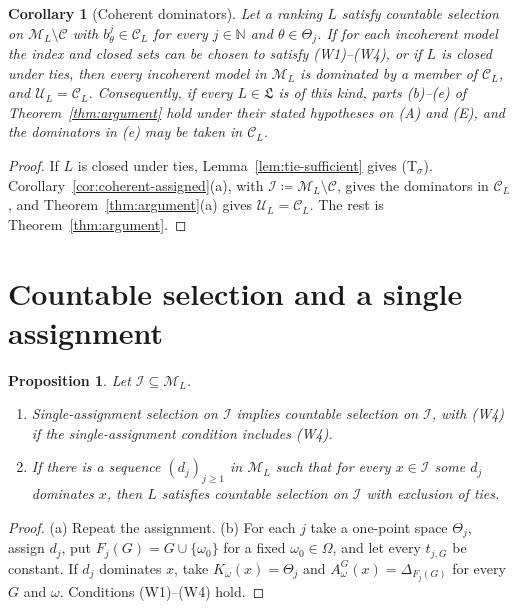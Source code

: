 \documentclass[11pt]{article}
\newtheorem{proposition}[theorem]{Proposition}
\newtheorem{corollary}[theorem]{Corollary}
\theoremstyle{definition}
\theoremstyle{remark}
\newcommand{\M}{\mathcal M}
\newcommand{\C}{\mathcal C}
\newcommand{\I}{\mathcal I}
\newcommand{\U}{\mathcal U}
\newcommand{\Lf}{\mathfrak L}
\begin{document}
\begin{corollary}[Coherent dominators]\label{cor:coherent-dominators}
Let a ranking $L$ satisfy countable selection on $\M_L\setminus\C$ with $b^j_\theta\in\C_L$ for every $j\in\mathbb N$ and $\theta\in\Theta_j$. If for each incoherent model the index and closed sets can be chosen to satisfy (W1)--(W4), or if $L$ is closed under ties, then every incoherent model in $\M_L$ is dominated by a member of $\C_L$, and $\U_L=\C_L$. Consequently, if every $L\in\Lf$ is of this kind, parts (b)--(e) of Theorem~\ref{thm:argument} hold under their stated hypotheses on (A) and (E), and the dominators in (e) may be taken in $\C_L$.
\end{corollary}
\begin{proof}
If $L$ is closed under ties, Lemma~\ref{lem:tie-sufficient} gives (T$_\sigma$). Corollary~\ref{cor:coherent-assigned}(a), with $\I\coloneqq\M_L\setminus\C$, gives the dominators in $\C_L$, and Theorem~\ref{thm:argument}(a) gives $\U_L=\C_L$. The rest is Theorem~\ref{thm:argument}.
\end{proof}

\section{Countable selection and a single assignment}\label{sec:scope}

\begin{proposition}\label{prop:comparison}
Let $\I\subseteq\M_L$.
\begin{enumerate}[label=(\alph*)]
\item Single-assignment selection on $\I$ implies countable selection on $\I$, with (W4) if the single-assignment condition includes (W4).
\item If there is a sequence $(d_j)_{j\ge1}$ in $\M_L$ such that for every $x\in\I$ some $d_j$ dominates $x$, then $L$ satisfies countable selection on $\I$ with exclusion of ties.
\end{enumerate}
\end{proposition}
\begin{proof}
(a) Repeat the assignment. (b) For each $j$ take a one-point space $\Theta_j$, assign $d_j$, put $F_j(G)=G\cup\{\omega_0\}$ for a fixed $\omega_0\in\Omega$, and let every $t_{j,G}$ be constant. If $d_j$ dominates $x$, take $K_\omega(x)=\Theta_j$ and $A^G_\omega(x)=\Delta_{F_j(G)}$ for every $G$ and $\omega$. Conditions (W1)--(W4) hold.
\end{proof}
\end{document}
